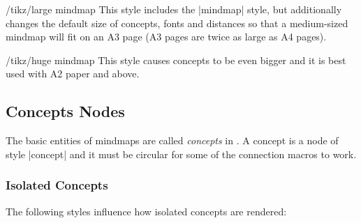 \begin{stylekey}{/tikz/large mindmap}
    This style includes the |mindmap| style, but additionally changes the
    default size of concepts, fonts and distances so that a medium-sized
    mindmap will fit on an A3 page (A3 pages are twice as large as A4 pages).
\end{stylekey}

\begin{stylekey}{/tikz/huge mindmap}
    This style causes concepts to be even bigger and it is best used with A2
    paper and above.
\end{stylekey}


\subsection{Concepts Nodes}

The basic entities of mindmaps are called \emph{concepts} in \tikzname. A
concept is a node of style |concept| and it must be circular for some of the
connection macros to work.


\subsubsection{Isolated Concepts}

The following styles influence how isolated concepts are rendered:

